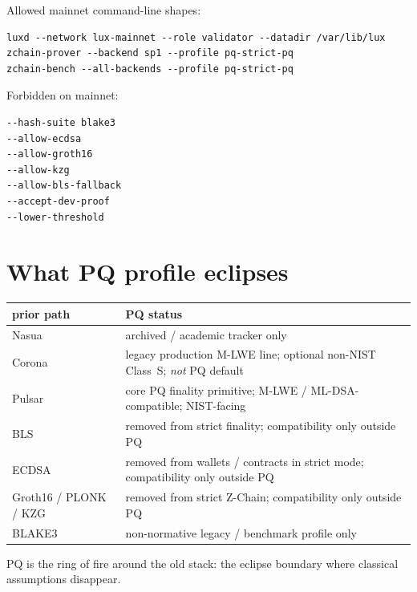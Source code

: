 \documentclass[11pt,a4paper]{article}
\newcommand{\PQ}{\textsf{PQ}}
\begin{document}
Allowed mainnet command-line shapes:

\begin{verbatim}
luxd --network lux-mainnet --role validator --datadir /var/lib/lux
zchain-prover --backend sp1 --profile pq-strict-pq
zchain-bench --all-backends --profile pq-strict-pq
\end{verbatim}

Forbidden on mainnet:

\begin{verbatim}
--hash-suite blake3
--allow-ecdsa
--allow-groth16
--allow-kzg
--allow-bls-fallback
--accept-dev-proof
--lower-threshold
\end{verbatim}

\section{What PQ profile eclipses}
\label{sec:eclipses}

\begin{center}\small
\begin{tabular}{l l}
\toprule
prior path & \PQ{} status \\
\midrule
Nasua             & archived / academic tracker only \\
Corona            & legacy production M-LWE line; optional non-NIST Class~S; \emph{not} \PQ{} default \\
Pulsar            & core \PQ{} finality primitive; M-LWE / ML-DSA-compatible; NIST-facing \\
BLS               & removed from strict finality; compatibility only outside \PQ{} \\
ECDSA             & removed from wallets / contracts in strict mode; compatibility only outside \PQ{} \\
Groth16 / PLONK / KZG & removed from strict Z-Chain; compatibility only outside \PQ{} \\
BLAKE3            & non-normative legacy / benchmark profile only \\
\bottomrule
\end{tabular}
\end{center}

\PQ{} is the ring of fire around the old stack: the eclipse
boundary where classical assumptions disappear.

\end{document}
